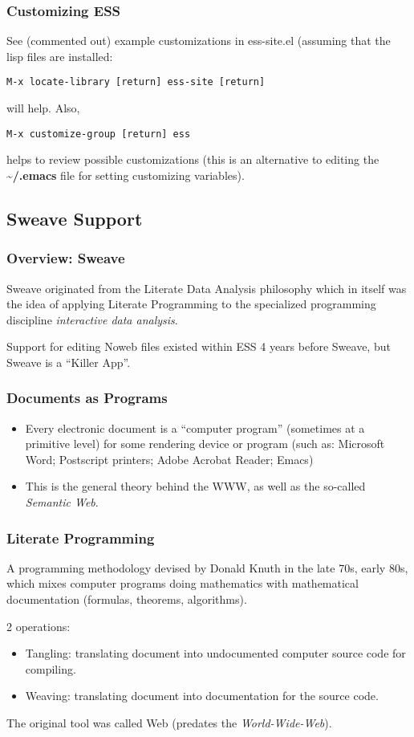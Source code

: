 \documentclass{beamer}
\begin{document}
\begin{frame}[fragile]
  \frametitle{Customizing ESS}
  See (commented out) example customizations in ess-site.el (assuming
  that the lisp files are installed:
\begin{verbatim}
M-x locate-library [return] ess-site [return]
\end{verbatim}
  will help.  Also, 
\begin{verbatim}
M-x customize-group [return] ess
\end{verbatim}
  helps to review possible customizations (this is an alternative to
  editing the \textbf{\~{}/.emacs} file for setting customizing
  variables).
\end{frame}

\subsection{Sweave Support}

\begin{frame}
  \frametitle{Overview: Sweave}
  Sweave originated from the Literate Data Analysis philosophy which
  in itself was the idea of applying Literate Programming to the
  specialized programming discipline \emph{interactive data analysis}.

  Support for editing Noweb files existed within ESS 4 years before
  Sweave, but Sweave is a ``Killer App''.
\end{frame}

\begin{frame}
  \frametitle{Documents as Programs}
  \begin{itemize}
  \item Every electronic document is a ``computer program'' (sometimes
    at a primitive level) for some rendering device or program (such
    as: Microsoft Word; Postscript printers; Adobe Acrobat Reader;
    Emacs)
  \item This is the general theory behind the WWW, as well as the
    so-called \emph{Semantic Web}.
  \end{itemize}
\end{frame}

\begin{frame}
  \frametitle{Literate Programming} 
  A programming methodology devised by Donald Knuth in the late 70s,
  early 80s, which mixes computer programs doing mathematics with
  mathematical documentation (formulas, theorems, algorithms).

  2 operations:
  \begin{itemize}
  \item Tangling: translating document into undocumented computer source code for
    compiling.
  \item Weaving: translating document into documentation for the source code.
  \end{itemize}
  The original tool was called Web (predates the \textit{World-Wide-Web}).
\end{frame}
\end{document}
